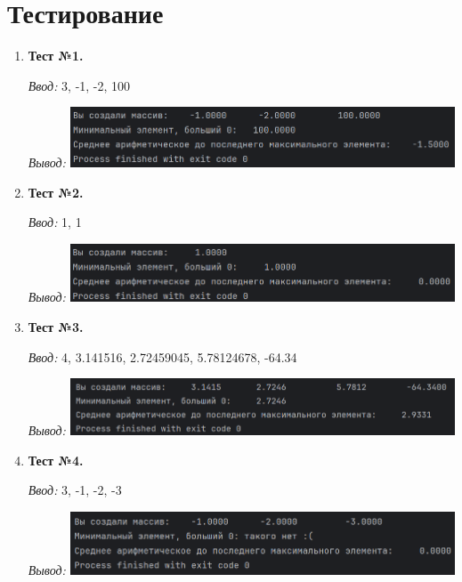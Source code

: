 \documentclass[12pt]{article}
\begin{document}
\newpage


\section*{Тестирование}

\begin{enumerate}

\item \textbf{Тест №1.} 

\textit{Ввод:} 3, -1, -2, 100

\textit{Вывод:} \includegraphics[width=0.9\textwidth]{img1}



\item \textbf{Тест №2.}

\textit{Ввод:} 1, 1

\textit{Вывод:} \includegraphics[width=0.9\textwidth]{img2}



\item \textbf{Тест №3.}

\textit{Ввод:} 4, 3.141516, 2.72459045, 5.78124678, -64.34

\textit{Вывод:} \includegraphics[width=0.9\textwidth]{img3}


\item \textbf{Тест №4.}

\textit{Ввод:} 3, -1, -2, -3

\textit{Вывод:} \includegraphics[width=0.9\textwidth]{img4}


\end{enumerate}
\end{document}
